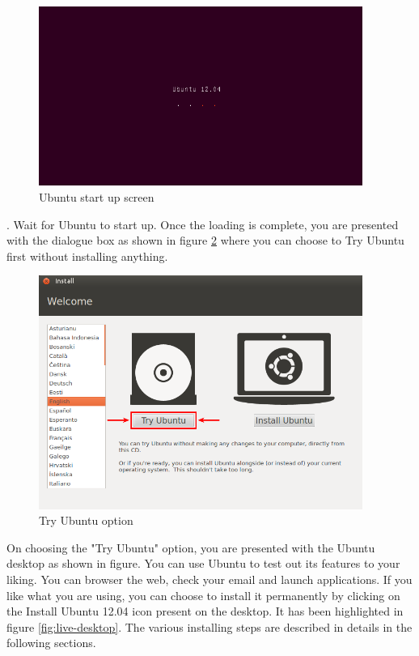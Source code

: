 \begin{figure}[h!]	
	\begin{center}
	\includegraphics[width=300pt]{./images/installation/basic-start.png}
	\caption{Ubuntu start up screen}	
	\label{fig:start-up}	
	\end{center}
\end{figure}

\par {}. Wait for Ubuntu to start up. Once the loading is complete, you are presented with the dialogue box as shown in figure \ref{fig:live-options} where you can choose to Try Ubuntu first without installing anything.\\

\begin{figure}[!h]	
	\begin{center}
	\includegraphics[width=300pt]{./images/installation/install-live-start.png}
	\caption{Try Ubuntu option}	
	\label{fig:live-options}	
	\end{center}
\end{figure}

\newpage
\par \noindent On choosing the "Try Ubuntu" option, you are presented with the Ubuntu desktop as shown in figure. You can use Ubuntu to test out its features to your liking. You can browser the web, check your email and launch applications. If you like what you are using, you can choose to install it permanently by clicking on the Install Ubuntu 12.04 icon present on the desktop. It has been highlighted in figure \ref{fig:live-desktop}. The various installing steps are described in details in the following sections. \\


